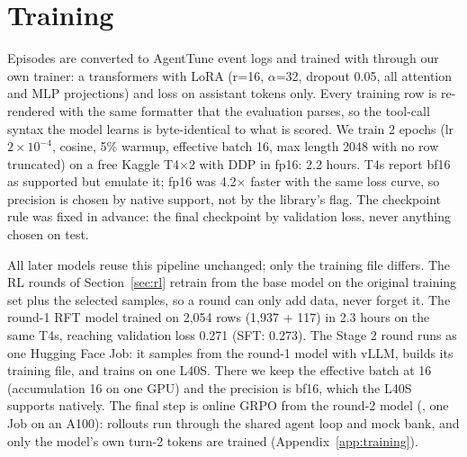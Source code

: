 \section{Training}
\label{sec:training}

Episodes are converted to AgentTune event logs and trained with  through our own trainer: a
transformers  with LoRA \citep{hu2022lora} (r=16, $\alpha$=32, dropout 0.05, all attention and MLP
projections) and loss on assistant tokens only. Every training row is re-rendered with the same formatter that the
evaluation parses, so the tool-call syntax the model learns is byte-identical to what is scored. We train 2 epochs
(lr $2\times10^{-4}$, cosine, 5\% warmup, effective batch 16, max length 2048 with no row truncated) on a free Kaggle
T4$\times$2 with DDP in fp16: 2.2 hours. T4s report bf16 as supported but emulate it; fp16 was 4.2$\times$ faster with
the same loss curve, so precision is chosen by native support, not by the library's flag. The checkpoint rule was
fixed in advance: the final checkpoint by validation loss, never anything chosen on test.

All later models reuse this pipeline unchanged; only the training file differs. The RL rounds of
Section~\ref{sec:rl} retrain from the base model on the original training set plus the selected samples, so a round
can only add data, never forget it. The round-1 RFT model trained on 2,054 rows (1,937 + 117) in 2.3 hours on the
same T4s, reaching validation loss 0.271 (SFT: 0.273). The Stage 2 round runs as one Hugging Face Job: it samples from
the round-1 model with vLLM, builds its training file, and trains on one L40S. There we keep the effective batch at 16
(accumulation 16 on one GPU) and the precision is bf16, which the L40S supports natively. The final step is online GRPO
from the round-2 model (, one Job on an A100): rollouts run through the shared agent loop and mock
bank, and only the model's own turn-2 tokens are trained (Appendix~\ref{app:training}).

